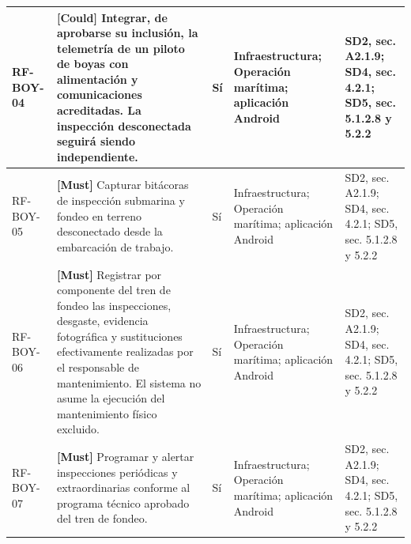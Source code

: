 \begin{paginaHorizontalSynaptix}
\begin{longtable}{|L{0.09\AnchoMatrizTDoce}|L{0.385\AnchoMatrizTDoce}|L{0.065\AnchoMatrizTDoce}|L{0.18\AnchoMatrizTDoce}|L{0.28\AnchoMatrizTDoce}|}
RF-\allowbreak{}BOY-\allowbreak{}04 &
\textbf{[Could]} Integrar, de aprobarse su inclusión, la telemetría de un piloto de boyas con alimentación y comunicaciones acreditadas. La inspección desconectada seguirá siendo independiente. &
Sí &
Infraestructura; Operación marítima; aplicación Android &
SD2, sec. A2.1.9; SD4, sec. 4.2.1; SD5, sec. 5.1.2.8 y 5.2.2 \\ \hline

RF-\allowbreak{}BOY-\allowbreak{}05 &
\textbf{[Must]} Capturar bitácoras de inspección submarina y fondeo en terreno desconectado desde la embarcación de trabajo. &
Sí &
Infraestructura; Operación marítima; aplicación Android &
SD2, sec. A2.1.9; SD4, sec. 4.2.1; SD5, sec. 5.1.2.8 y 5.2.2 \\ \hline

RF-\allowbreak{}BOY-\allowbreak{}06 &
\textbf{[Must]} Registrar por componente del tren de fondeo las inspecciones, desgaste, evidencia fotográfica y sustituciones efectivamente realizadas por el responsable de mantenimiento. El sistema no asume la ejecución del mantenimiento físico excluido. &
Sí &
Infraestructura; Operación marítima; aplicación Android &
SD2, sec. A2.1.9; SD4, sec. 4.2.1; SD5, sec. 5.1.2.8 y 5.2.2 \\ \hline

RF-\allowbreak{}BOY-\allowbreak{}07 &
\textbf{[Must]} Programar y alertar inspecciones periódicas y extraordinarias conforme al programa técnico aprobado del tren de fondeo. &
Sí &
Infraestructura; Operación marítima; aplicación Android &
SD2, sec. A2.1.9; SD4, sec. 4.2.1; SD5, sec. 5.1.2.8 y 5.2.2 \\ \hline
\end{longtable}



\end{paginaHorizontalSynaptix}
